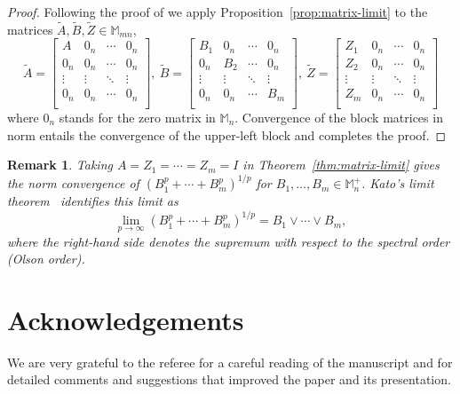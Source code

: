 \documentclass[11pt]{amsart}
\numberwithin{equation}{section}
\newtheorem{remark}[theorem]{Remark}
\newcommand{\bM}{\mathbb{M}}
\newcommand{\Mnp}{\mathbb M_n^+}
\begin{document}
\vskip 5pt
\begin{proof} Following the proof of \cite[Corollary 2.7]{BourinLee2016} we apply Proposition~\ref{prop:matrix-limit} to the matrices
$\tilde{A},\tilde{B},\tilde{Z}\in \bM_{mn}$,
\begin{equation*}\label{eqblock}
\tilde{A}=\begin{bmatrix} A& 0_n&\cdots &0_n \\
0_n &0_n&\cdots &0_n \\
\vdots &\vdots &\ddots &\vdots \\
0_n& 0_n&\cdots &0_n \\
\end{bmatrix}, \
\tilde{B}=\begin{bmatrix} B_1& 0_n&\cdots &0_n \\
0_n &B_2&\cdots &0_n \\
\vdots &\vdots &\ddots &\vdots \\
0_n& 0_n&\cdots &B_m \\
\end{bmatrix}, \
\tilde{Z}=\begin{bmatrix} Z_1& 0_n&\cdots &0_n \\
Z_2 &0_n&\cdots &0_n \\
\vdots &\vdots &\ddots &\vdots \\
Z_m& 0_n&\cdots &0_n \\
\end{bmatrix}
\end{equation*}
where $0_n$ stands for the zero matrix in $\bM_n$.
Convergence of the block matrices in norm entails the convergence
of the upper-left block and completes the proof.
\end{proof}
\endgroup


\begin{remark}\label{rem:kato-limit}
Taking $A=Z_1=\cdots=Z_m=I$ in
Theorem~\ref{thm:matrix-limit} gives the norm convergence of
$(B_1^p+\cdots+B_m^p)^{1/p}$ for $B_1,\ldots,B_m\in\Mnp$.
Kato's limit theorem~\cite{Kato1979} identifies this limit as
\begin{equation}\label{eq:kato-limit}
 \lim_{p\to\infty}(B_1^p+\cdots+B_m^p)^{1/p}
 =B_1\vee\cdots\vee B_m,
\end{equation}
where the right-hand side denotes the supremum with respect
to the spectral order (Olson order).
\end{remark}




\section*{Acknowledgements}
We are very grateful to the referee for a careful reading of
the manuscript and for detailed comments and suggestions
that improved the paper and its presentation.
\end{document}
